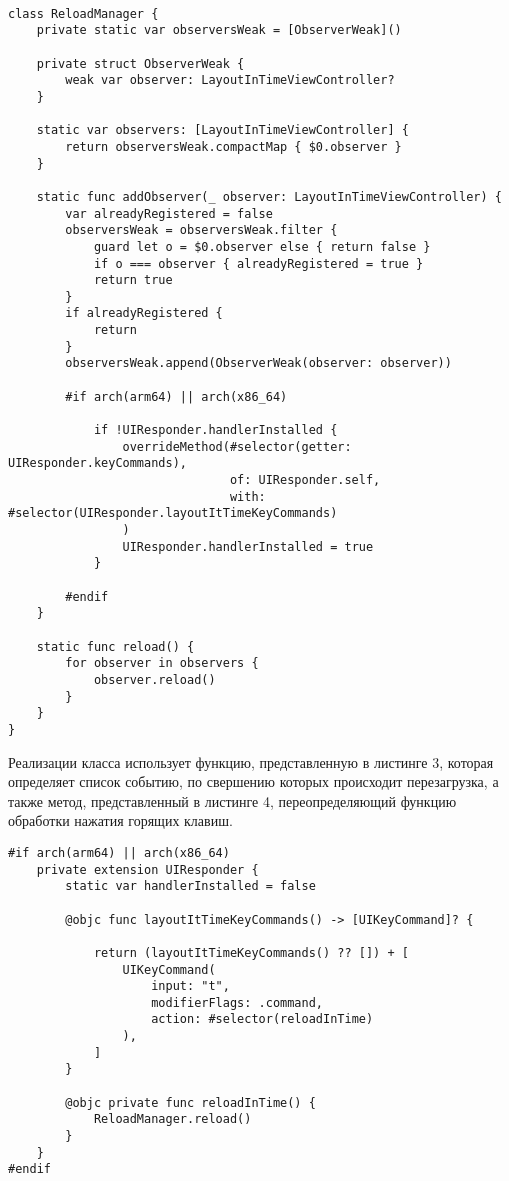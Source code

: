 \begin{lstlisting}[caption={Класс, обеспечивающий перезагрузку по время выполнения}]

class ReloadManager {
    private static var observersWeak = [ObserverWeak]()

    private struct ObserverWeak {
        weak var observer: LayoutInTimeViewController?
    }

    static var observers: [LayoutInTimeViewController] {
        return observersWeak.compactMap { $0.observer }
    }

    static func addObserver(_ observer: LayoutInTimeViewController) {
        var alreadyRegistered = false
        observersWeak = observersWeak.filter {
            guard let o = $0.observer else { return false }
            if o === observer { alreadyRegistered = true }
            return true
        }
        if alreadyRegistered {
            return
        }
        observersWeak.append(ObserverWeak(observer: observer))

        #if arch(arm64) || arch(x86_64)

            if !UIResponder.handlerInstalled {
                overrideMethod(#selector(getter: UIResponder.keyCommands),
                               of: UIResponder.self,
                               with: #selector(UIResponder.layoutItTimeKeyCommands)
                )
                UIResponder.handlerInstalled = true
            }

        #endif
    }

    static func reload() {
        for observer in observers {
            observer.reload()
        }
    }
}
\end{lstlisting}

Реализации класса использует функцию, представленную в листинге 3, которая определяет список событию, по свершению которых происходит перезагрузка, а также метод, представленный в листинге 4, переопределяющий функцию обработки нажатия горящих клавиш. 

\begin{lstlisting}[caption={Функция определения списка событий, по свершению которых происходит перезагрузка}]
#if arch(arm64) || arch(x86_64)
    private extension UIResponder {
        static var handlerInstalled = false

        @objc func layoutItTimeKeyCommands() -> [UIKeyCommand]? {

            return (layoutItTimeKeyCommands() ?? []) + [
                UIKeyCommand(
                    input: "t",
                    modifierFlags: .command,
                    action: #selector(reloadInTime)
                ),
            ]
        }

        @objc private func reloadInTime() {
            ReloadManager.reload()
        }
    }
#endif
\end{lstlisting}

